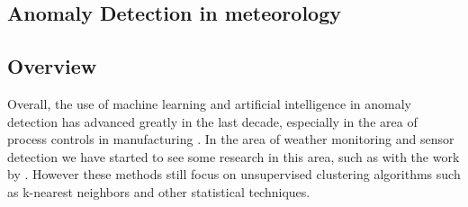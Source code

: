 \subsection{Anomaly Detection in meteorology}

\subsection{Overview}

Overall, the use of machine learning and artificial intelligence in anomaly detection has advanced greatly in the last decade, especially in the area of process controls in manufacturing \cite{venkatasubramanianReviewProcessFault2003}.  In the area of weather monitoring and sensor detection we have started to see some research in this area, such as with the work by \citet{onalWeatherDataAnalysis2017}.  However these methods still focus on unsupervised clustering algorithms such as k-nearest neighbors and other statistical techniques.

